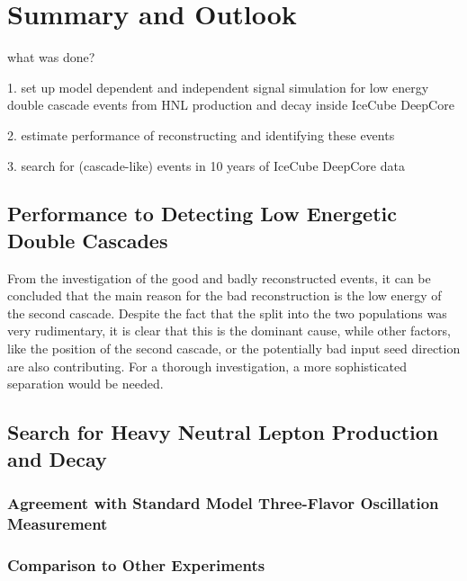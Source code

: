 \setchapterpreamble[u]{\margintoc}

\chapter{Summary and Outlook}

what was done?

1. set up model dependent and independent signal simulation for low energy double cascade events from HNL production and decay inside IceCube DeepCore

2. estimate performance of reconstructing and identifying these events

3. search for (cascade-like) events in 10 years of IceCube DeepCore data


\section{Performance to Detecting Low Energetic Double Cascades}

 


From the investigation of the good and badly reconstructed events, it can be concluded that the main reason for the bad reconstruction is the low energy of the second cascade. Despite the fact that the split into the two populations was very rudimentary, it is clear that this is the dominant cause, while other factors, like the position of the second cascade, or the potentially bad input seed direction are also contributing. For a thorough investigation, a more sophisticated separation would be needed.


\section{Search for Heavy Neutral Lepton Production and Decay}

\subsection{Agreement with Standard Model Three-Flavor Oscillation Measurement}


\subsection{Comparison to Other Experiments}

